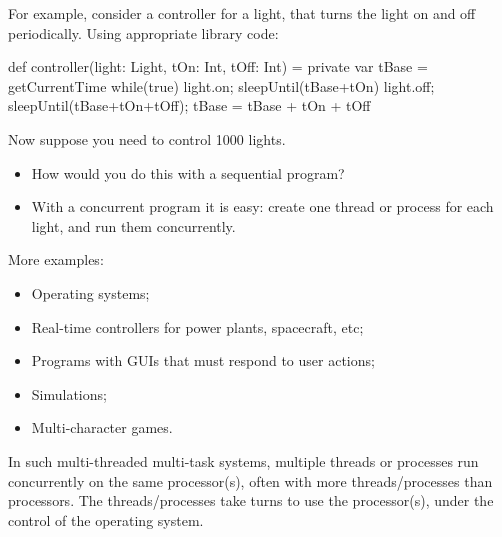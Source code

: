 \documentclass[notes,color]{sepslide0}
\begin{document}
\begin{slide}

For example, consider a controller for a light, that turns the light on and
off periodically.  Using appropriate library code:
%
\begin{scala}
def controller(light: Light, tOn: Int, tOff: Int) = {
  private var tBase = getCurrentTime
  while(true){
    light.on; sleepUntil(tBase+tOn)
    light.off; sleepUntil(tBase+tOn+tOff); tBase = tBase + tOn + tOff
  }
}
\end{scala}

Now suppose you need to control 1000 lights.  
%
\begin{itemize}
\item
How would you do this with a sequential program?

\item
With a concurrent program it is easy: create one thread or process for each
light, and run them concurrently.
\end{itemize}
\end{slide}


\begin{slide}

More examples:
%
\begin{itemize}
\item
Operating systems;

\item
Real-time controllers for power plants, spacecraft, etc;

\item
Programs with GUIs that must respond to user actions;

\item
Simulations;

\item
Multi-character games.
\end{itemize}

In such multi-threaded multi-task systems, multiple threads or processes run
concurrently on the same processor(s), often with more threads/processes than
processors.  The threads/processes take turns to use the processor(s), under
the control of the operating system.
\end{slide}

\end{document}

